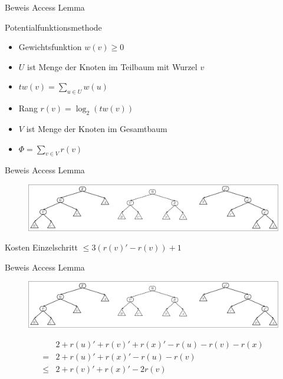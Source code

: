 \documentclass[11pt]{beamer}
\begin{document}
\begin{frame}{Beweis Access Lemma}
	\begin{block}{Potentialfunktionsmethode}
		\begin{itemize}
			\item Gewichtsfunktion $w\left(v\right) \geq 0$ 
			\pause 
			\item $U$ ist Menge der Knoten im Teilbaum mit Wurzel $v$
			\item $\mathit{tw}\left(v\right) = \sum_{u \in U} w\left(u\right)$
			\pause 
			\item Rang $r\left(v\right) = \log_2 \left(tw\left(v\right)\right)$
			\pause
			\item $V$ ist Menge der Knoten im Gesamtbaum
			\item $\Phi = \sum_{v \in V} r\left(v\right)$
		\end{itemize}
	\end{block}
\end{frame}
\begin{frame}{Beweis Access Lemma}
		\begin{figure}[H]
		\centering
		\includegraphics[width=1\textwidth]{"Medien/pres/zigZigKlein"}
		
	\end{figure}
	
	\begin{block}{Kosten Einzelschritt}
		$\leq 3 \left(r\left(v\right)' - r\left(v\right)\right) + 1$
	\end{block}
\end{frame}

\begin{frame}{Beweis Access Lemma}
		\begin{figure}[H]
		\centering
		\includegraphics[width=1\textwidth]{"Medien/pres/zigZigKlein"}
		
	\end{figure}
	\begin{align*}
	& 2 + r\left(u\right)' +r\left(v\right)' +r\left(x\right)' - r\left(u\right)- r\left(v\right)- r\left(x\right)\\
    = & 2 + r\left(u\right)' +r\left(x\right)' - r\left(u\right)- r\left(v\right)\\
     \leq &  2 + r\left(v\right)' + r\left(x\right)' - 2 r\left(v\right) 
	\end{align*}
\end{frame}
\end{document}
